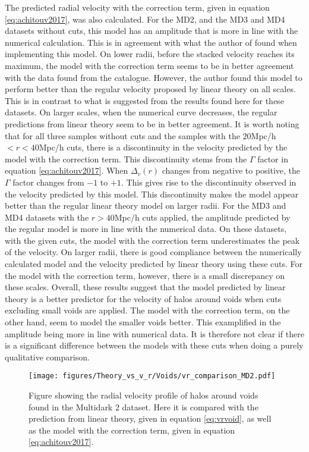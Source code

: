 The predicted radial velocity with the correction term, given in equation \ref{eq:achitouv2017}, was also calculated. For the MD2, and the MD3 and MD4 datasets without cuts, this model has an amplitude that is more in line with the numerical calculation. This is in agreement with what the author of \cite{Achitouv_streaming} found when implementing this model. On lower radii, before the stacked velocity reaches its maximum, the model with the correction term seems to be in better agreement with the data found from the catalogue. However, the author found this model to perform better than the regular velocity proposed by linear theory on all scales. This is in contrast to what is suggested from the results found here for these datasets. On larger scales, when the numerical curve decreases, the regular predictions from linear theory seem to be in better agreement. It is worth noting that for all three samples without cuts and the samples with the $20$Mpc/h$<r<40$Mpc/h cuts, there is a discontinuity in the velocity predicted by the model with the correction term. This discontinuity stems from the $\Gamma$ factor in equation \ref{eq:achitouv2017}. When $\Delta_v(r)$ changes from negative to positive, the $\Gamma$ factor changes from $-1$ to $+1$. This gives rise to the discontinuity observed in the velocity predicted by this model. This discontinuity makes the model appear better than the regular linear theory model on larger radii. For the MD3 and MD4 datasets with the $r>40$Mpc/h cuts applied, the amplitude predicted by the regular model is more in line with the numerical data. On these datasets, with the given cuts, the model with the correction term underestimates the peak of the velocity. On larger radii, there is good compliance between the numerically calculated model and the velocity predicted by linear theory using these cuts. For the model with the correction term, however, there is a small discrepancy on these scales. Overall, these results suggest that the model predicted by linear theory is a better predictor for the velocity of halos around voids when cuts excluding small voids are applied. The model with the correction term, on the other hand, seem to model the smaller voids better. This examplified in the amplitude being more in line with numerical data. It is therefore not clear if there is a significant difference between the models with these cuts when doing a purely qualitative comparison.
\begin{figure}[H]
    \texttt{[image: figures/Theory\_vs\_v\_r/Voids/vr\_comparison\_MD2.pdf]}
    \caption{Figure showing the radial velocity profile of halos around voids found in the Multidark 2 dataset. Here it is compared with the prediction from linear theory, given in equation \ref{eq:vrvoid}, as well as the model with the correction term, given in equation \ref{eq:achitouv2017}.}
    \label{fig:vrMD2}
\end{figure}

